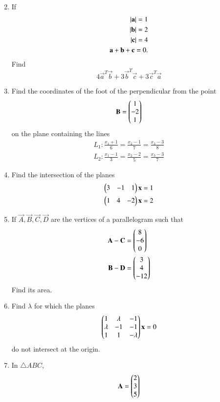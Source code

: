 \documentclass[journal,12pt,twocolumn]{IEEEtran}
\begin{document}
\begin{enumerate}[label=\arabic*.]
\begin{equation}
\end{equation}
%
\item If 
\begin{align}
\left\vert\mathbf{a}\right\vert=1
\\
\left\vert\mathbf{b}\right\vert=2
\\
\left\vert\mathbf{c}\right\vert=4
\\
\mathbf{a}+\mathbf{b}+\mathbf{c}=0.
\end{align}
Find
\begin{equation}
4\vec{a}^T\vec{b}+3\vec{b}^T\vec{c}+3\vec{c}^T\vec{a}
\end{equation}
\item Find the coordinates of the foot of the perpendicular from the point
\begin{equation}
\mathbf{B}=\begin{pmatrix}1 \\ -2 \\ 1\end{pmatrix}
\end{equation}
%
on the plane containing the lines
\begin{align}
L_1:\frac{x_1+1}{6}=
\frac{x_2-1}{7} = 
\frac{x_3-3}{8}
\\
L_2:\frac{x_1-1}{3}=
\frac{x_2-2}{5} = 
\frac{x_3-3}{7}
\end{align}
%
\item Find the intersection of the planes
\begin{align}
\begin{pmatrix}3 & -1 & 1\end{pmatrix}\mathbf{x} &= 1
\\
\begin{pmatrix}1 & 4 & -2\end{pmatrix}\mathbf{x} &= 2
\end{align}
%
\item If $\vec{A},\vec{B},\vec{C},\vec{D}$ are the vertices of a parallelogram such that
\begin{align}
\mathbf{A}-\mathbf{C}&=\begin{pmatrix}8 \\ -6 \\ 0\end{pmatrix}
\\
\mathbf{B}-\mathbf{D}&=\begin{pmatrix}3 \\ 4 \\ -12\end{pmatrix}
\end{align}
%
Find its area.
\item Find $\lambda$ for which the planes
\begin{align}
\begin{pmatrix}1 & \lambda & -1
\\
\lambda & -1 & -1
\\
1 & 1 & -\lambda
\end{pmatrix}
\mathbf{x}
=0
\end{align}
%
do not intersect at the origin.
%
\item In $\triangle ABC$,
\begin{align}
\vec{A}=\myvec{2 \\ 3 \\ 5}

\end{align}
\end{enumerate}
\end{document}
